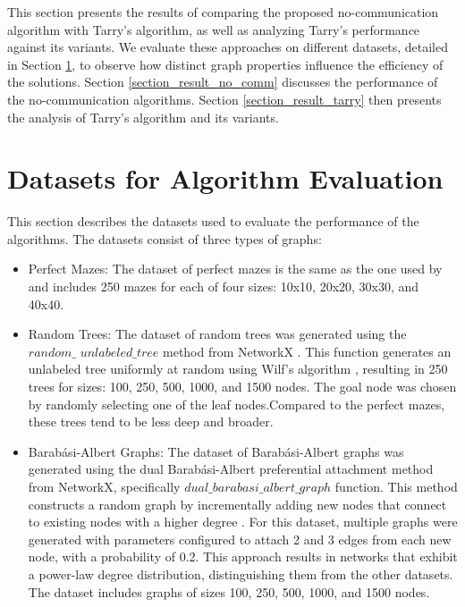 This section presents the results of comparing the proposed no-communication algorithm with Tarry's algorithm, as well as analyzing Tarry's performance against its variants. We evaluate these approaches on different datasets, detailed in Section \ref{section_datasets}, to observe how distinct graph properties influence the efficiency of the solutions. Section \ref{section_result_no_comm} discusses the performance of the no-communication algorithms. Section \ref{section_result_tarry} then presents the analysis of Tarry's algorithm and its variants.

\section{Datasets for Algorithm Evaluation} 
\label{section_datasets}

This section describes the datasets used to evaluate the performance of the algorithms. The datasets consist of three types of graphs:

\begin{itemize} 
    \item Perfect Mazes: The dataset of perfect mazes \cite{Naeem2021} is the same as the one used by  and includes 250 mazes for each of four sizes: 10x10, 20x20, 30x30, and 40x40.
    \item Random Trees: The dataset of random trees was generated using the $random\_$ $unlabeled\_tree$ method from NetworkX \cite{Hagberg2008}. This function generates an unlabeled tree uniformly at random using Wilf's algorithm \cite{Wilf1981}, resulting in 250 trees for sizes: 100, 250, 500, 1000, and 1500 nodes. The goal node was chosen by randomly selecting one of the leaf nodes.Compared to the perfect mazes, these trees tend to be less deep and broader.
    \item Barabási-Albert Graphs: The dataset of Barabási-Albert graphs was generated using the dual Barabási-Albert preferential attachment method \cite{Moshiri2018} from NetworkX, specifically $dual\_barabasi\_albert\_graph$ function. This method constructs a random graph by incrementally adding new nodes that connect to existing nodes with a higher degree \cite{Barabasi1999}. For this dataset, multiple graphs were generated with parameters configured to attach 2 and 3 edges from each new node, with a probability of 0.2. This approach results in networks that exhibit a power-law degree distribution, distinguishing them from the other datasets. The dataset includes graphs of sizes 100, 250, 500, 1000, and 1500 nodes.
\end{itemize}

